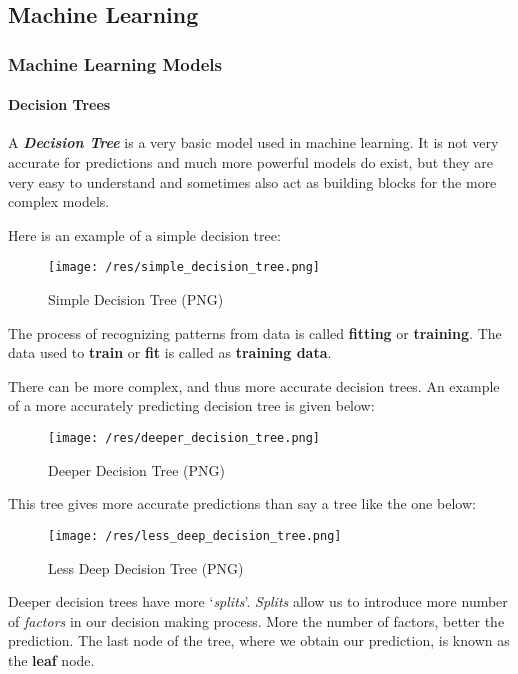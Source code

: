 \documentclass[11pt]{article}
\makeatletter
\def\maxwidth{\ifdim\Gin@nat@width>\linewidth\linewidth
    \else\Gin@nat@width\fi}
\let\Oldincludegraphics\includegraphics
\renewcommand{\includegraphics}[1]{\Oldincludegraphics[width=.8\maxwidth]{#1}}
\makeatother
\begin{document}
    \hypertarget{machine-learning}{%
\subsection{Machine Learning}\label{machine-learning}}

\hypertarget{machine-learning-models}{%
\subsubsection{Machine Learning Models}\label{machine-learning-models}}

    \hypertarget{decision-trees}{%
\paragraph{Decision Trees}\label{decision-trees}}

A \textbf{\emph{Decision Tree}} is a very basic model used in machine
learning. It is not very accurate for predictions and much more powerful
models do exist, but they are very easy to understand and sometimes also
act as building blocks for the more complex models.

    Here is an example of a simple decision tree:

\begin{figure}
\centering
\texttt{[image: /res/simple\_decision\_tree.png]}
\caption{Simple Decision Tree (PNG)}
\end{figure}

    The process of recognizing patterns from data is called \textbf{fitting}
or \textbf{training}. The data used to \textbf{train} or \textbf{fit} is
called as \textbf{training data}.

There can be more complex, and thus more accurate decision trees. An
example of a more accurately predicting decision tree is given below:

\begin{figure}
\centering
\texttt{[image: /res/deeper\_decision\_tree.png]}
\caption{Deeper Decision Tree (PNG)}
\end{figure}

This tree gives more accurate predictions than say a tree like the one
below:

\begin{figure}
\centering
\texttt{[image: /res/less\_deep\_decision\_tree.png]}
\caption{Less Deep Decision Tree (PNG)}
\end{figure}

    Deeper decision trees have more `\emph{splits}'. \emph{Splits} allow us
to introduce more number of \emph{factors} in our decision making
process. More the number of factors, better the prediction. The last
node of the tree, where we obtain our prediction, is known as the
\textbf{leaf} node.
\end{document}
